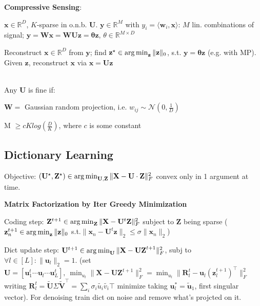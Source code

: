 \textbf{Compressive Sensing}:
\begin{inparaitem}[\color{red}\textbullet]
  \item $\mathbf{x} \in \mathbb{R}^D$, $K$-sparse in o.n.b. $\mathbf{U}$. $\mathbf{y} \in \mathbb{R}^M$ with $y_i = \langle \mathbf{w}_i, \mathbf{x}\rangle $: $M$ lin. combinations of signal; $\mathbf{y} = \mathbf{Wx} = \mathbf{WUz} = \mathbf{\theta z}$, $\theta \in \mathbb{R}^{M \times D}$
  \item Reconstruct $\mathbf{x} \in \mathbb{R}^D$ from $\mathbf{y}$; find $\mathbf{z}^\star \in \operatorname*{arg\,min}_{\mathbf{z}}\|\mathbf{z}\|_0$, s.t. $\mathbf{y} = \mathbf{\theta z}$ (e.g. with MP). Given $\mathbf{z}$, reconstruct $\mathbf{x}$ via $\mathbf{x} = \mathbf{Uz}$
\end{inparaitem}
\\Any $\mathbf{U}$ is fine if:
\begin{inparaitem}[\color{red}\textbullet]
  \item $\mathbf{W} = $ Gaussian random projection, i.e. $w_{ij}\sim\mathcal{N}(0, \frac{1}{D})$
  \item M $\geq cK log(\frac{D}{K})$, where $c$ is some constant
\end{inparaitem}

\subsection*{Dictionary Learning}
Objective: $(\mathbf{U}^\star, \mathbf{Z}^\star) \in \operatorname*{arg\,min}_\mathbf{U,Z} \| \mathbf{X} - \mathbf{U} \cdot \mathbf{Z} \|_F^2$ convex only in 1 argument at time.

\textbf{Matrix Factorization by Iter Greedy Minimization}
\begin{inparaenum}
  \item Coding step: $\mathbf{Z}^{t+1} \in \operatorname*{arg\,min}_\mathbf{Z} \| \mathbf{X} - \mathbf{U}^t \mathbf{Z} \|_F^2$ subject to $\mathbf{Z}$ being sparse ($\mathbf{z}_n^{t+1}\in \operatorname*{arg\,min}_\mathbf{z}\|\mathbf{z}\|_0$ s.t.$\|\mathbf{x}_n - \mathbf{U}^t\mathbf{z}\|_2 \le \sigma \|\mathbf{x}_n\|_2$)
  \item Dict update step: $\mathbf{U}^{t+1} \in \operatorname*{arg\,min}_\mathbf{U} \| \mathbf{X} - \mathbf{UZ}^{t+1} \|_F^2$, subj to $\forall l\in [L]:\|\mathbf{u}_l\|_2 = 1$. (set $\mathbf{U} = [\mathbf{u}_1^t\cdots \mathbf{u}_l\cdots \mathbf{u}_L^t],~ \min_{u_l}\|\mathbf{X} - \mathbf{U}\mathbf{Z}^{t+1}\|_F^2 = \min_{u_l}\|\mathbf{R}_l^t - \mathbf{u}_l(\mathbf{z}_l^{t+1})^\top\|_F^2$ writing $\mathbf{R}_l^t = \tilde{\mathbf{U}}\Sigma\tilde{\mathbf{V}}^\top= \sum_{i}\sigma_i\tilde{u_i}\tilde{v_i}\top $ minimize taking $\mathbf{u}^*_l=\tilde{\mathbf{u}}_1$, first singular vector). For denoising train dict on noise and remove what's projcted on it.
\end{inparaenum}
